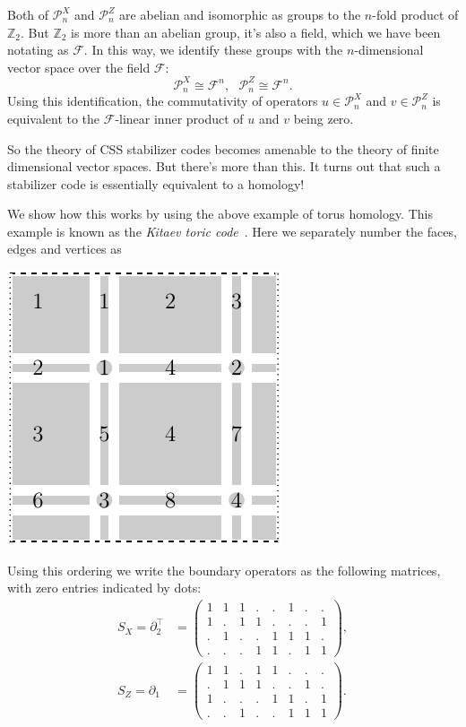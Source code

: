 \documentclass[11pt,oneside]{report}
\def\Z{\mathbb{Z}}
\def\Pauli{\mathcal{P}}
\newcommand{\Field}{\mathcal{F}}
\begin{document}
Both of $\Pauli_n^X$ and $\Pauli_n^Z$ are abelian and
isomorphic as groups to the $n$-fold product of $\Z_2$.
But $\Z_2$ is more than an abelian group, it's also a field,
which we have been notating as $\Field.$
In this way, we identify these groups with the $n$-dimensional
vector space over the field $\Field:$
$$
\Pauli_n^X \cong \Field^n,\ \ \ 
\Pauli_n^Z \cong \Field^n.
$$
Using this identification, the commutativity of 
operators $u\in\Pauli_n^X$ and $v\in\Pauli_n^Z$
is equivalent to the $\Field$-linear
inner product of $u$ and $v$ being zero.

So the theory of CSS stabilizer codes becomes 
amenable to the theory of finite dimensional vector
spaces. But there's more than this.
It turns out that such a stabilizer code 
is essentially equivalent to a homology!

We show how this works by 
using the above example of torus homology.
This example is known as the \emph{Kitaev toric code}\ \cite{Dennis2002}.
Here we separately number
the faces, edges and vertices as
\begin{center}
\includegraphics{pic-torus-count.pdf}
\end{center}
Using this ordering 
we write 
the boundary operators as the following matrices, with
zero entries indicated by dots:
\begin{align*}
S_X = \partial_2^{\top} &= \left( \begin{array}{cccccccc}
1&1&1&.&.&1&.&.\\
1&.&1&1&.&.&.&1\\
.&1&.&.&1&1&1&.\\
.&.&.&1&1&.&1&1
\end{array} \right),\\
S_Z = \partial_1 &= \left( \begin{array}{cccccccc}
1&1&.&1&1&.&.&.\\
.&1&1&1&.&.&1&.\\
1&.&.&.&1&1&.&1\\
.&.&1&.&.&1&1&1
\end{array} \right).
\end{align*}
\end{document}
